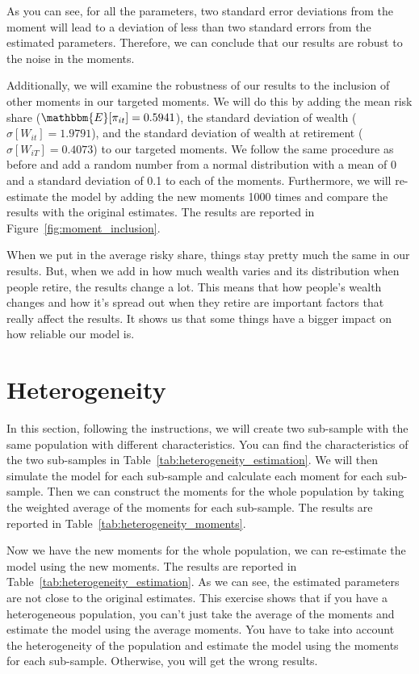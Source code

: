 \documentclass[13pt]{article}
\begin{document}
As you can see, for all the parameters, two standard error deviations from the moment will lead to a deviation of less than two standard errors from the estimated parameters. Therefore, we can conclude that our results are robust to the noise in the moments.




Additionally, we will examine the robustness of our results to the inclusion of other moments in our targeted moments. We will do this by adding the mean risk share ($\mathbbm{E}[\pi_{it}] = 0.5941$), the standard deviation of wealth ($\sigma[W_{it}] = 1.9791$), and the standard deviation of wealth at retirement ($\sigma[W_{iT}] = 0.4073$) to our targeted moments. We follow the same procedure as before and add a random number from a normal distribution with a mean of 0 and a standard deviation of 0.1 to each of the moments. Furthermore, we will re-estimate the model by adding the new moments 1000 times and compare the results with the original estimates. The results are reported in Figure~\ref{fig:moment_inclusion}.

When we put in the average risky share, things stay pretty much the same in our results. But, when we add in how much wealth varies and its distribution when people retire, the results change a lot. This means that how people's wealth changes and how it's spread out when they retire are important factors that really affect the results. It shows us that some things have a bigger impact on how reliable our model is.





\FloatBarrier
\section{Heterogeneity}
In this section, following the instructions, we will create two sub-sample with the same population with different characteristics. You can find the characteristics of the two sub-samples in Table~\ref{tab:heterogeneity_estimation}. We will then simulate the model for each sub-sample and calculate each moment for each sub-sample. Then we can construct the moments for the whole population by taking the weighted average of the moments for each sub-sample. The results are reported in Table~\ref{tab:heterogeneity_moments}.

Now we have the new moments for the whole population, we can re-estimate the model using the new moments. The results are reported in Table~\ref{tab:heterogeneity_estimation}. As we can see, the estimated parameters are not close to the original estimates. This exercise shows that if you have a heterogeneous population, you can't just take the average of the moments and estimate the model using the average moments. You have to take into account the heterogeneity of the population and estimate the model using the moments for each sub-sample. Otherwise, you will get the wrong results. 



\end{document}
